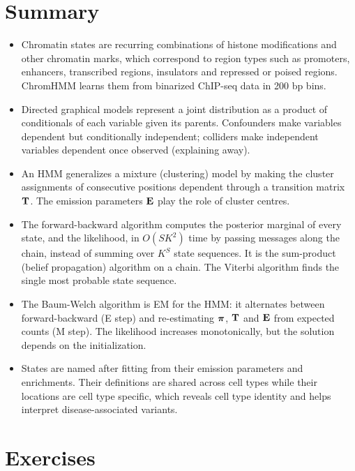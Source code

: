 \section{Summary}

\begin{itemize}
  \item Chromatin states are recurring combinations of histone modifications and other chromatin marks, which correspond to region types such as promoters, enhancers, transcribed regions, insulators and repressed or poised regions. ChromHMM learns them from binarized ChIP-seq data in 200 bp bins.
  \item Directed graphical models represent a joint distribution as a product of conditionals of each variable given its parents. Confounders make variables dependent but conditionally independent; colliders make independent variables dependent once observed (explaining away).
  \item An HMM generalizes a mixture (clustering) model by making the cluster assignments of consecutive positions dependent through a transition matrix $\mathbf{T}$. The emission parameters $\mathbf{E}$ play the role of cluster centres.
  \item The forward-backward algorithm computes the posterior marginal of every state, and the likelihood, in $O(SK^2)$ time by passing messages along the chain, instead of summing over $K^{S}$ state sequences. It is the sum-product (belief propagation) algorithm on a chain. The Viterbi algorithm finds the single most probable state sequence.
  \item The Baum-Welch algorithm is EM for the HMM: it alternates between forward-backward (E step) and re-estimating $\boldsymbol{\pi}$, $\mathbf{T}$ and $\mathbf{E}$ from expected counts (M step). The likelihood increases monotonically, but the solution depends on the initialization.
  \item States are named after fitting from their emission parameters and enrichments. Their definitions are shared across cell types while their locations are cell type specific, which reveals cell type identity and helps interpret disease-associated variants.
\end{itemize}

\section*{Exercises}

